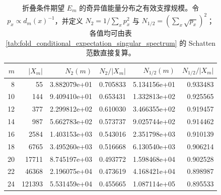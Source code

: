 \begin{table}[H]
\centering
\scriptsize
\setlength{\tabcolsep}{6pt}
\caption{折叠条件期望 $E_m$ 的奇异值能量分布之有效支撑规模。令 $p_x\propto d_m(x)^{-1}$，并定义 $N_2=1/\sum_x p_x^2$ 与 $N_{1/2}=(\sum_x\sqrt{p_x})^2$；各值均可由表 \ref{tab:fold_conditional_expectation_singular_spectrum} 的 Schatten 范数直接复算。}
\label{tab:fold_conditional_expectation_effective_support}
\begin{tabular}{r r r r r r}
\toprule
$m$ & $|X_m|$ & $N_2(m)$ & $N_2/|X_m|$ & $N_{1/2}(m)$ & $N_{1/2}/|X_m|$\\
\midrule
8 & 55 & 3.882079e+01 & 0.705833 & 5.134156e+01 & 0.933483\\
10 & 144 & 9.409410e+01 & 0.653431 & 1.332813e+02 & 0.925565\\
12 & 377 & 2.299812e+02 & 0.610030 & 3.466355e+02 & 0.919457\\
14 & 987 & 5.662783e+02 & 0.573737 & 9.025744e+02 & 0.914462\\
16 & 2584 & 1.403153e+03 & 0.543016 & 2.351798e+03 & 0.910139\\
18 & 6765 & 3.495260e+03 & 0.516668 & 6.130540e+03 & 0.906214\\
20 & 17711 & 8.745197e+03 & 0.493772 & 1.598468e+04 & 0.902528\\
22 & 46368 & 2.196075e+04 & 0.473619 & 4.168421e+04 & 0.898987\\
24 & 121393 & 5.531459e+04 & 0.455665 & 1.087114e+05 & 0.895533\\
\bottomrule
\end{tabular}
\end{table}
